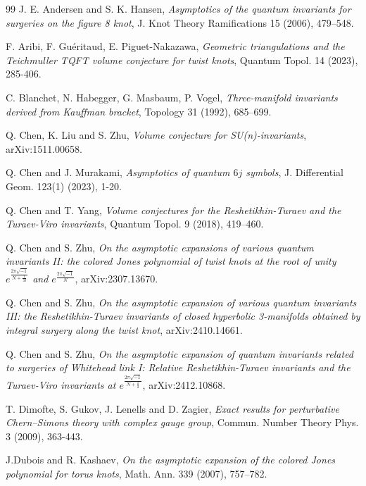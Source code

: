 \documentclass[12pt]{amsart}
\begin{document}
\begin{thebibliography}{99}
 J. E. Andersen and S. K. Hansen, {\em Asymptotics of the quantum invariants for surgeries on the
figure 8 knot}, J. Knot Theory Ramifications 15 (2006), 479–548.



 F. Aribi, F. Guéritaud, E. Piguet-Nakazawa, {\em Geometric triangulations and the Teichmuller TQFT volume conjecture for twist knots}, Quantum Topol. 14 (2023), 285-406.


 C. Blanchet, N. Habegger, G. Masbaum, P. Vogel, {\em Three-manifold invariants derived from Kauffman bracket}, Topology 31 (1992), 685–699.

 Q. Chen, K. Liu and S. Zhu, {\em Volume conjecture for SU(n)-invariants}, arXiv:1511.00658.


 Q. Chen and J. Murakami, {\em Asymptotics of quantum $6j$ symbols}, J. Differential Geom. 123(1) (2023), 1-20.

 Q. Chen and T. Yang, {\em Volume conjectures for the Reshetikhin-Turaev and the Turaev-Viro invariants}, Quantum Topol. 9 (2018), 419–460.


 Q. Chen and S. Zhu, {\em On the asymptotic expansions of various quantum invariants II: the colored Jones polynomial of twist knots at the root of unity $e^{\frac{2\pi\sqrt{-1}}{N+\frac{1}{M}}}$ and $e^{\frac{2\pi\sqrt{-1}}{N}}$}, arXiv:2307.13670.

 Q. Chen and S. Zhu, {\em  On the asymptotic expansion of various quantum invariants III:
the Reshetikhin-Turaev invariants of closed hyperbolic 3-manifolds obtained by integral surgery along the twist knot},  arXiv:2410.14661.


 Q. Chen and S. Zhu, {\em On the asymptotic expansion of quantum invariants related to surgeries of Whitehead link I: Relative Reshetikhin-Turaev invariants and the Turaev-Viro invariants at $e^{\frac{2\pi\sqrt{-1}}{N+\frac{1}{2}}}$}, arXiv:2412.10868.

 T. Dimofte, S. Gukov, J. Lenells and D. Zagier,   {\em Exact results for perturbative Chern–Simons
theory with complex gauge group}, Commun. Number Theory Phys. 3 (2009), 363-443.

 J.Dubois and R. Kashaev, {\em On the asymptotic expansion of the colored Jones polynomial for torus
knots}, Math. Ann. 339 (2007), 757–782.


\end{thebibliography}
\end{document}
